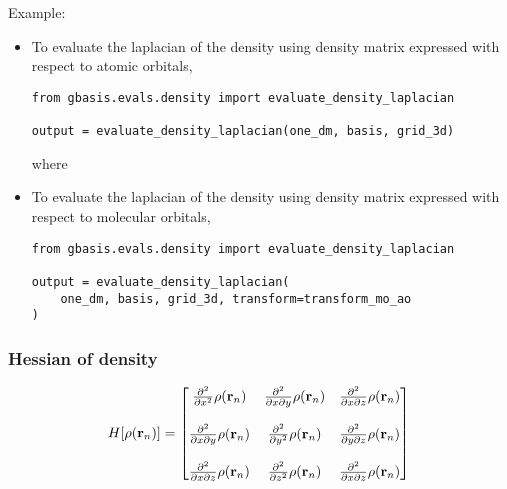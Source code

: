 \documentclass[letterpaper]{article}
\begin{document}
Example:
\begin{itemize}
\item To evaluate the laplacian of the density using density matrix expressed
  with respect to atomic orbitals,
  \begin{lstlisting}[xleftmargin=-25pt]
from gbasis.evals.density import evaluate_density_laplacian

output = evaluate_density_laplacian(one_dm, basis, grid_3d)
\end{lstlisting}
  where
\item To evaluate the laplacian of the density using density matrix expressed
  with respect to molecular orbitals,
  \begin{lstlisting}[xleftmargin=-25pt]
from gbasis.evals.density import evaluate_density_laplacian

output = evaluate_density_laplacian(
    one_dm, basis, grid_3d, transform=transform_mo_ao
)
\end{lstlisting}
\end{itemize}
\subsubsection{Hessian of density}
\begin{equation}
  H[\rho(\mathbf{r}_n)]
  =
  \begin{bmatrix}
    \frac{\partial^2}{\partial x^2} \rho(\mathbf{r}_n) &
    \frac{\partial^2}{\partial x \partial y} \rho(\mathbf{r}_n) &
    \frac{\partial^2}{\partial x \partial z} \rho(\mathbf{r}_n)\\\\
    \frac{\partial^2}{\partial x \partial y} \rho(\mathbf{r}_n) &
    \frac{\partial^2}{\partial y^2} \rho(\mathbf{r}_n)&
    \frac{\partial^2}{\partial y \partial z} \rho(\mathbf{r}_n)\\\\
    \frac{\partial^2}{\partial x \partial z} \rho(\mathbf{r}_n) &
    \frac{\partial^2}{\partial z^2} \rho(\mathbf{r}_n)&
    \frac{\partial^2}{\partial x \partial z} \rho(\mathbf{r}_n)\\
  \end{bmatrix}\\
\end{equation}
\end{document}
